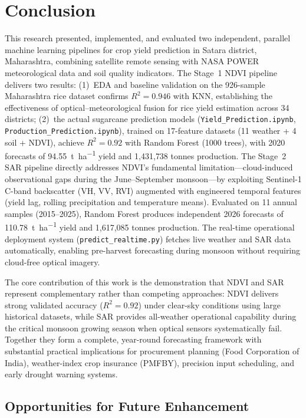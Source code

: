 \documentclass[conference]{IEEEtran}
\begin{document}
\section{Conclusion}

This research presented, implemented, and evaluated two independent, parallel
machine learning pipelines for crop yield prediction in Satara district,
Maharashtra, combining satellite remote sensing with NASA POWER meteorological
data and soil quality indicators. The Stage~1 NDVI pipeline delivers two
results: (1)~EDA and baseline validation on the 926-sample Maharashtra rice
dataset confirms $R^2 = 0.946$ with KNN, establishing the effectiveness of
optical--meteorological fusion for rice yield estimation across 34 districts;
(2)~the actual sugarcane prediction models (\texttt{Yield\_Prediction.ipynb},
\texttt{Production\_Prediction.ipynb}), trained on 17-feature datasets
(11 weather + 4 soil + NDVI), achieve $R^2 = 0.92$ with Random Forest (1000
trees), with 2020 forecasts of \SI{94.55}{\tonne\per\hectare} yield and
1{,}431{,}738 tonnes production. The Stage~2 SAR pipeline directly addresses
NDVI's fundamental limitation---cloud-induced observational gaps during the
June--September monsoon---by exploiting Sentinel-1 C-band backscatter (VH,
VV, RVI) augmented with engineered temporal features (yield lag, rolling
precipitation and temperature means). Evaluated on 11 annual samples
(2015--2025), Random Forest produces independent 2026 forecasts of
\SI{110.78}{\tonne\per\hectare} yield and 1{,}617{,}085 tonnes production.
The real-time operational deployment system (\texttt{predict\_realtime.py})
fetches live weather and SAR data automatically, enabling pre-harvest
forecasting during monsoon without requiring cloud-free optical imagery.

The core contribution of this work is the demonstration that NDVI and SAR
represent complementary rather than competing approaches: NDVI delivers strong
validated accuracy ($R^2 = 0.92$) under clear-sky conditions using large
historical datasets, while SAR provides all-weather operational capability
during the critical monsoon growing season when optical sensors systematically
fail. Together they form a complete, year-round forecasting framework with
substantial practical implications for procurement planning (Food Corporation
of India), weather-index crop insurance (PMFBY), precision input scheduling,
and early drought warning systems.

\subsection{Opportunities for Future Enhancement}
\end{document}
